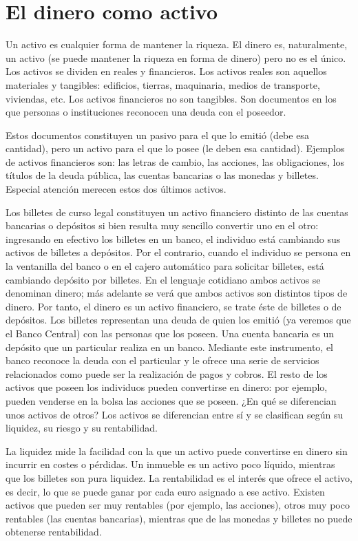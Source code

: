 \documentclass[
]{krantz}
\begin{document}
\hypertarget{el-dinero-como-activo}{%
\section{El dinero como activo}\label{el-dinero-como-activo}}

Un activo es cualquier forma de mantener la riqueza. El dinero es, naturalmente, un activo (se puede mantener la riqueza en forma de dinero) pero no es el único. Los activos se dividen en reales y financieros. Los activos reales son aquellos materiales y tangibles: edificios, tierras, maquinaria, medios de transporte, viviendas, etc. Los activos financieros no son tangibles. Son documentos en los que personas o instituciones reconocen una deuda con el poseedor.

Estos documentos constituyen un pasivo para el que lo emitió (debe esa cantidad), pero un activo para el que lo posee (le deben esa cantidad). Ejemplos de activos financieros son: las letras de cambio, las acciones, las obligaciones, los títulos de la deuda pública, las cuentas bancarias o las monedas y billetes. Especial atención merecen estos dos últimos activos.

Los billetes de curso legal constituyen un activo financiero distinto de las cuentas bancarias o depósitos si bien resulta muy sencillo convertir uno en el otro: ingresando en efectivo los billetes en un banco, el individuo está cambiando sus activos de billetes a depósitos. Por el contrario, cuando el individuo se persona en la ventanilla del banco o en el cajero automático para solicitar billetes, está cambiando depósito por billetes. En el lenguaje cotidiano ambos activos se denominan dinero; más adelante se verá que ambos activos son distintos tipos de dinero. Por tanto, el dinero es un activo financiero, se trate éste de billetes o de depósitos. Los billetes representan una deuda de quien los emitió (ya veremos que el Banco Central) con las personas que los poseen. Una cuenta bancaria es un depósito que un particular realiza en un banco. Mediante este instrumento, el banco reconoce la deuda con el particular y le ofrece una serie de servicios relacionados como puede ser la realización de pagos y cobros. El resto de los activos que poseen los individuos pueden convertirse en dinero: por ejemplo, pueden venderse en la bolsa las acciones que se poseen. ¿En qué se diferencian unos activos de otros? Los activos se diferencian entre sí y se clasifican según su liquidez, su riesgo y su rentabilidad.

La liquidez mide la facilidad con la que un activo puede convertirse en dinero sin incurrir en costes o pérdidas. Un inmueble es un activo poco líquido, mientras que los billetes son pura liquidez. La rentabilidad es el interés que ofrece el activo, es decir, lo que se puede ganar por cada euro asignado a ese activo. Existen activos que pueden ser muy rentables (por ejemplo, las acciones), otros muy poco rentables (las cuentas bancarias), mientras que de las monedas y billetes no puede obtenerse rentabilidad.
\end{document}
